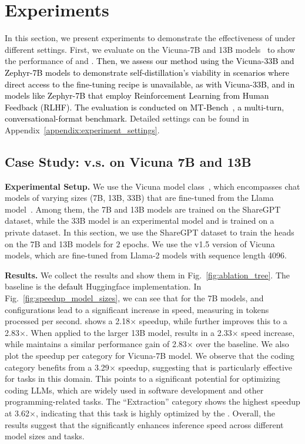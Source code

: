 \section{Experiments}
In this section, we present experiments to demonstrate the effectiveness of \ours under different settings. First, we evaluate \ours on the Vicuna-7B and 13B models~\citep{vicuna2023} to show the performance of  and . 
\textcolor{black}{Then, we assess our method using the Vicuna-33B and Zephyr-7B models to demonstrate self-distillation's viability in scenarios where direct access to the fine-tuning recipe is unavailable, as with Vicuna-33B, and in models like Zephyr-7B that employ Reinforcement Learning from Human Feedback (RLHF). The evaluation is conducted on MT-Bench~\citep{zheng2023judging}, a multi-turn, conversational-format benchmark.}
Detailed settings can be found in Appendix~\ref{appendix:experiment_settings}.



\subsection{Case Study:  v.s.  on Vicuna 7B and 13B}

\textbf{Experimental Setup.}
We use the Vicuna model class~\citep{vicuna2023}, which encompasses chat models of varying sizes (7B, 13B, 33B) that are fine-tuned from the Llama model~\citep{touvron2023llama}. Among them, the 7B and 13B models are trained on the ShareGPT~\citep{sharegpt2023} dataset, while the 33B model is an experimental model and is trained on a private dataset. 
In this section, we use the ShareGPT dataset to train the \ours heads on the 7B and 13B models for $2$ epochs. We use the v1.5 version of Vicuna models, which are fine-tuned from Llama-2 models with sequence length 4096. 


\textbf{Results.}
We collect the results and show them in Fig.~\ref{fig:ablation_tree}. The baseline is the 
\textcolor{black}{default}
Huggingface implementation. In Fig.~\ref{fig:speedup_model_sizes}, we can see that for the 7B models,  and  configurations lead to a significant increase in speed, measuring in tokens processed per second.  shows a 2.18$\times$ speedup, while  further improves this to a 2.83$\times$.
When applied to the larger 13B model,  results in a 2.33$\times$ speed increase, while  maintains a similar performance gain of 2.83$\times$ over the baseline.
We also plot the speedup per category for  Vicuna-7B model. 
We observe that the coding category benefits from a 3.29$\times$ speedup, suggesting that \ours is particularly effective for tasks in this domain. This points to a significant potential for optimizing coding LLMs, which are widely used in software development and other programming-related tasks. 
The ``Extraction'' category shows the highest speedup at 3.62$\times$, indicating that this task is highly optimized by the \ours.
Overall, the results suggest that the \ours significantly enhances inference speed across different model sizes and tasks.


